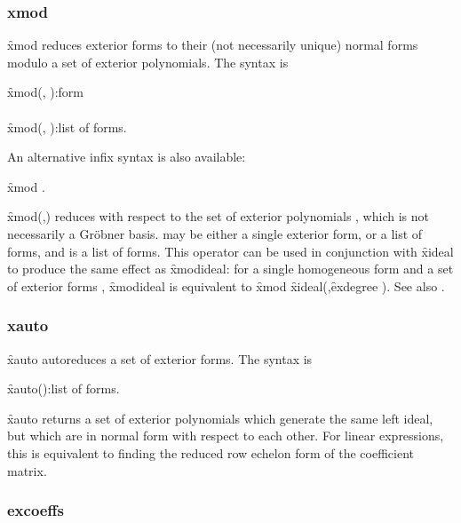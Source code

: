\subsubsection*{xmod}

\hypertarget{operator:XMOD}{}
\f{xmod}
 reduces exterior forms to their (not necessarily unique) normal
forms modulo a set of exterior polynomials. The syntax is
\begin{syntaxtable}
     \f{xmod}(, ):form\\
     \\
     \f{xmod}(, ):list of forms.
\end{syntaxtable}
An alternative infix syntax is also available:
\begin{syntax}
       \f{xmod}  .
\end{syntax}
\f{xmod}(,) reduces  with respect to the set of exterior polynomials
, which is not necessarily a Gr{\"o}bner basis.  may be either a
single exterior form, or a list of forms, and  is a list of
forms. This operator can be used in conjunction with \f{xideal} to produce
the same effect as \f{xmodideal}: for a single homogeneous form  and a
set of exterior forms ,  \f{xmodideal}  is equivalent to
 \f{xmod} \f{xideal}(,\f{exdegree} ). See also .


\subsubsection*{xauto}

\hypertarget{operator:XAUTO}{}
\f{xauto} autoreduces a set of exterior forms. The syntax is
\begin{syntax}
     \f{xauto}():list of forms.
\end{syntax}
\f{xauto}  returns a set of exterior polynomials which generate the same
left ideal, but which are in normal form with respect to each other. For
linear expressions, this is equivalent to finding the reduced row echelon
form of the coefficient matrix.


\subsubsection*{excoeffs}

